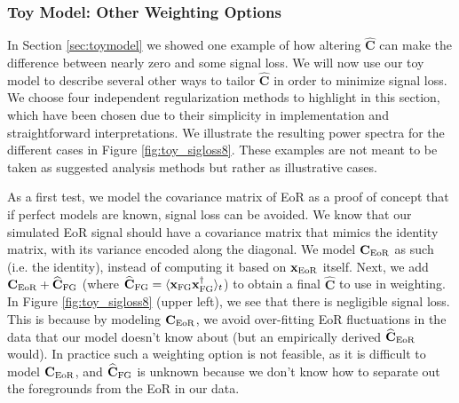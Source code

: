 \documentclass[preprint2,numberedappendix,tighten]{aastex6}  %
\begin{document}
\subsubsection{Toy Model: Other Weighting Options}
\label{sec:otherweight}

In Section \ref{sec:toymodel} we showed one example of how altering $\widehat{\textbf{C}}$ can 
make the difference between nearly zero and some signal loss. We will now use our toy model to describe several other ways to tailor $\widehat{\textbf{C}}$ 
in order to minimize signal loss. We choose four independent regularization methods to highlight in this section, which have 
been chosen due to their simplicity in implementation and straightforward interpretations. We illustrate the resulting power 
spectra for the different cases in Figure \ref{fig:toy_sigloss8}.
These examples are not meant to be taken as suggested analysis methods but rather as illustrative cases. 

As a first test, we model the covariance matrix of EoR as a proof of concept that if perfect models are known, signal loss can be 
avoided. We know that our simulated EoR signal should have a covariance matrix that mimics the identity matrix, with its 
variance encoded along the diagonal. We model $\textbf{C}_{\rm EoR}$ as such (i.e. the identity), instead of computing it based on $\textbf{x}
_{\rm EoR}$ itself. Next, we add $\textbf{C}_{\rm EoR} + \widehat{\textbf{C}}_{\rm FG}$ (where $\widehat{\textbf{C}}_{\rm FG} = \langle\textbf{x}_{\rm FG}
\textbf{x}_{\rm FG}^{\dagger}\rangle_{t}$) to obtain a final $\widehat{\textbf{C}}$ to use in weighting. In Figure \ref{fig:toy_sigloss8} (upper 
left), we see that there is negligible signal loss. This is because by modeling $\textbf{C}_{\rm EoR}$, we avoid over-fitting EoR fluctuations in the data that our model doesn't know about (but an empirically derived $\widehat{\textbf{C}}_{\rm EoR}$ would). 
In practice such a weighting option is not feasible, as it is difficult to model $\textbf{C}_{\rm EoR}$, and $\widehat{\textbf{C}}_{\rm FG}$ is unknown because we don't know how to separate out the foregrounds from the EoR in our data.
\end{document}
